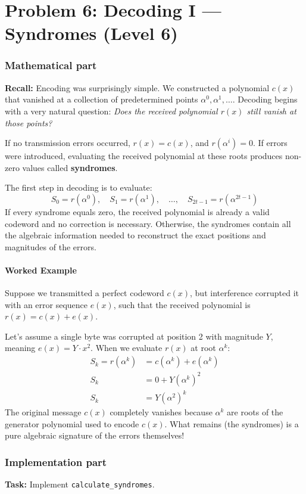 \section*{Problem 6: Decoding I --- Syndromes (Level 6)}

\subsubsection*{Mathematical part}
\textbf{Recall:} Encoding was surprisingly simple. We constructed a polynomial $c(x)$ that vanished at a collection of predetermined points $\alpha^0, \alpha^1, \dots$. Decoding begins with a very natural question: \emph{Does the received polynomial $r(x)$ still vanish at those points?}

If no transmission errors occurred, $r(x) = c(x)$, and $r(\alpha^i) = 0$. If errors were introduced, evaluating the received polynomial at these roots produces non-zero values called \textbf{syndromes}.

The first step in decoding is to evaluate:
\[
S_0 = r(\alpha^0), \quad S_1 = r(\alpha^1), \quad \ldots, \quad S_{2t-1} = r(\alpha^{2t-1})
\]
If every syndrome equals zero, the received polynomial is already a valid codeword and no correction is necessary. Otherwise, the syndromes contain all the algebraic information needed to reconstruct the exact positions and magnitudes of the errors.

\paragraph{Worked Example}
Suppose we transmitted a perfect codeword $c(x)$, but interference corrupted it with an error sequence $e(x)$, such that the received polynomial is $r(x) = c(x) + e(x)$. 

Let's assume a single byte was corrupted at position 2 with magnitude $Y$, meaning $e(x) = Y \cdot x^2$. 
When we evaluate $r(x)$ at root $\alpha^k$:
\begin{align*}
S_k = r(\alpha^k) &= c(\alpha^k) + e(\alpha^k) \\
S_k &= 0 + Y (\alpha^k)^2 \\
S_k &= Y (\alpha^2)^k
\end{align*}
The original message $c(x)$ completely vanishes because $\alpha^k$ are roots of the generator polynomial used to encode $c(x)$. What remains (the syndromes) is a pure algebraic signature of the errors themselves!

\subsubsection*{Implementation part}
\textbf{Task:} Implement \lstinline|calculate_syndromes|.

